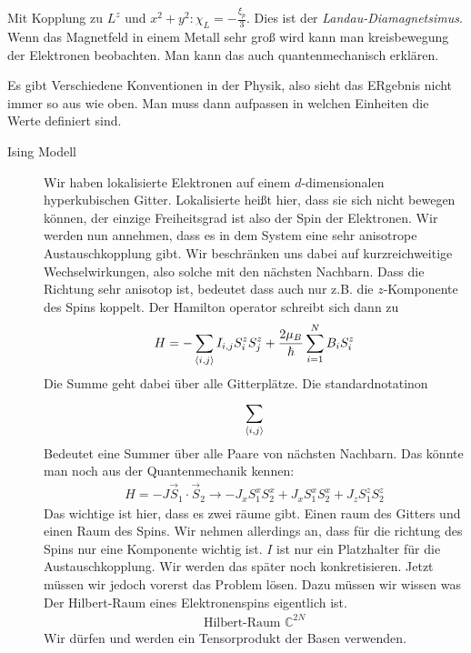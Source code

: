 \begin{description}
\begin{enumerate}[1)]
        Mit Kopplung zu $L^z$ und $x^2 + y^2: \chi_L = - \frac{\xi_p}{3}$. Dies
        ist der \emph{Landau-Diamagnetsimus}.
        Wenn das Magnetfeld in einem Metall sehr groß wird kann man kreisbewegung
        der Elektronen beobachten. Man kann das auch quantenmechanisch erklären.

        Es gibt Verschiedene Konventionen in der Physik, also sieht das ERgebnis
        nicht immer so aus wie oben. Man muss dann aufpassen in welchen 
        Einheiten die Werte definiert sind.
        
    \end{enumerate} 
\end{description}
    \begin{description}
      \item[Ising Modell] Wir haben lokalisierte Elektronen auf einem $d$-dimensionalen
        hyperkubischen Gitter. Lokalisierte heißt hier, dass sie sich nicht bewegen
        können, der einzige Freiheitsgrad ist also der Spin der Elektronen.
        Wir werden nun annehmen, dass es in dem System eine sehr anisotrope
        Austauschkopplung gibt. Wir beschränken uns dabei auf kurzreichweitige
        Wechselwirkungen, also solche mit den nächsten Nachbarn. Dass die
        Richtung sehr anisotop ist, bedeutet dass auch nur z.B. die $z$-Komponente
        des Spins koppelt. Der Hamilton operator schreibt sich dann zu
        \begin{align*}
          H = - \sum_{\Braket{i,j}}^{} I_{i,j} S_i^z S_j^z + 
          \frac{2 \mu_B}{\hbar} \sum_{i=1}^{N} B_i S_i^z
        \end{align*}
        Die Summe geht dabei über alle Gitterplätze.
        Die standardnotatinon
        \begin{align*}
          \sum_{\Braket{i,j}}^{}
        \end{align*}
        Bedeutet eine Summer über alle Paare von nächsten Nachbarn.
        Das könnte man noch aus der Quantenmechanik kennen:
        \begin{align*}
          H = - J \vec{S}_1 \cdot \vec{S}_2 \to 
          - J_x S_1^x S_2^x + J_x S_1^x S_2^x + J_z S_1^z S_2^z
        \end{align*}
        Das wichtige ist hier, dass es zwei räume gibt. Einen raum des Gitters
        und einen Raum des Spins. Wir nehmen allerdings an, dass für die richtung
        des Spins nur eine Komponente wichtig ist. $I$ ist nur ein Platzhalter
        für die Austauschkopplung. Wir werden das später noch konkretisieren.
        Jetzt müssen wir jedoch vorerst das Problem lösen. Dazu müssen wir
        wissen was Der Hilbert-Raum eines Elektronenspins eigentlich ist.
        \begin{align*}
          \text{Hilbert-Raum } \mathbb{C}^{2N}
        \end{align*}
        Wir dürfen und werden ein Tensorprodukt der Basen verwenden.


\end{description}
